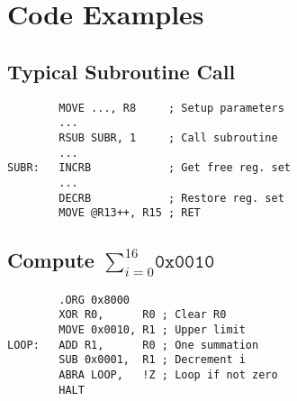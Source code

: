 \documentclass{leaflet}
\begin{document}
 \section{Code Examples}
  \subsection{Typical Subroutine Call}
   \begin{verbatim}
        MOVE ..., R8     ; Setup parameters 
        ...
        RSUB SUBR, 1     ; Call subroutine
        ...
SUBR:   INCRB            ; Get free reg. set
        ...
        DECRB            ; Restore reg. set
        MOVE @R13++, R15 ; RET
   \end{verbatim}
\vspace*{-5mm}
  \subsection{Compute $\sum_{i=0}^{16}{\texttt{0x0010}}$}
   \begin{verbatim}
        .ORG 0x8000
        XOR R0,      R0 ; Clear R0
        MOVE 0x0010, R1 ; Upper limit
LOOP:   ADD R1,      R0 ; One summation
        SUB 0x0001,  R1 ; Decrement i
        ABRA LOOP,   !Z ; Loop if not zero
        HALT
   \end{verbatim}
\end{document}
